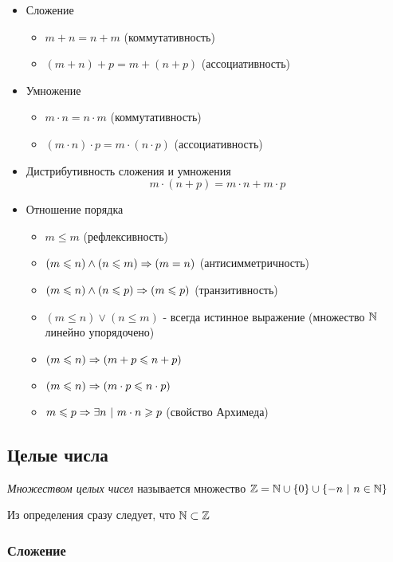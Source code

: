 \begin{itemize}
    \item Сложение
    \begin{itemize}
        \item $m + n = n + m$ (коммутативность)
        \item $(m + n) + p = m + (n + p)$ (ассоциативность)
    \end{itemize}
    \item Умножение
    \begin{itemize}
        \item $m \cdot n = n \cdot m$ (коммутативность)
        \item $(m \cdot n) \cdot p = m \cdot (n \cdot p)$ (ассоциативность)
    \end{itemize}
    \item Дистрибутивность сложения и умножения
    \[
    	m \cdot (n + p) = m \cdot n + m \cdot p
    \]
    \item Отношение порядка
    \begin{itemize}
        \item $m \le m$ (рефлексивность)
        \item $(m \leqslant n) \wedge (n \leqslant m) \Rightarrow (m = n)$ (антисимметричность)
        \item $(m \leqslant n) \wedge (n \leqslant p) \Rightarrow (m \leqslant p)$ (транзитивность)
        \item $(m \le n) \vee (n \le m)$ - всегда истинное выражение (множество $\mathbb{N}$ линейно упорядочено)
        \item $(m \leqslant n) \Rightarrow (m + p \leqslant n + p)$
        \item $(m \leqslant n) \Rightarrow (m \cdot p \leqslant n \cdot p)$
        \item $m \leqslant p \Rightarrow \exists n\ |\ m \cdot n \geqslant p$ (свойство Архимеда)
    \end{itemize}
\end{itemize}


\subsection{Целые числа}

\begin{definition}
    \textit{Множеством целых чисел} называется множество $\mathbb{Z} = \mathbb{N} \cup \{0\} \cup \{-n\ |\ n \in \mathbb{N}\}$
\end{definition}

Из определения сразу следует, что $\mathbb{N} \subset \mathbb{Z}$

\subsubsection*{Сложение}

